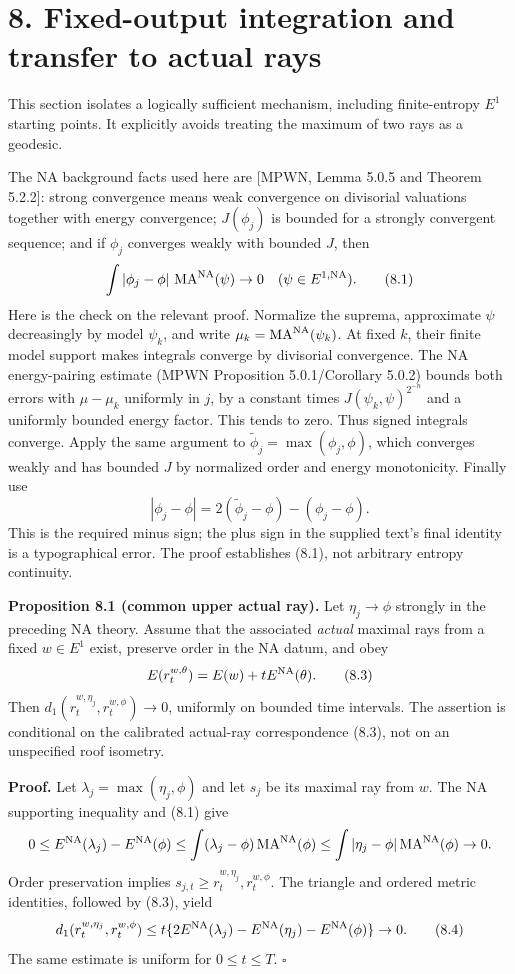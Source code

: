 \documentclass[
  11pt,
]{article}
\begin{document}
\section{8. Fixed-output integration and transfer to actual
rays}\label{fixed-output-integration-and-transfer-to-actual-rays}

This section isolates a logically sufficient mechanism, including
finite-entropy \(E^1\) starting points. It explicitly avoids treating
the maximum of two rays as a geodesic.

The NA background facts used here are {[}MPWN, Lemma 5.0.5 and Theorem
5.2.2{]}: strong convergence means weak convergence on divisorial
valuations together with energy convergence; \(J(\phi_j)\) is bounded
for a strongly convergent sequence; and if \(\phi_j\) converges weakly
with bounded \(J\), then \[
 \int|\phi_j-\phi|\,\operatorname{MA}^{\rm NA}(\psi)\to0
       \quad(\psi\in E^{1,\rm NA}).                         \tag{8.1}
\] Here is the check on the relevant proof. Normalize the suprema,
approximate \(\psi\) decreasingly by model \(\psi_k\), and write
\(\mu_k=\operatorname{MA}^{\rm NA}(\psi_k)\). At fixed \(k\), their
finite model support makes integrals converge by divisorial convergence.
The NA energy-pairing estimate (MPWN Proposition 5.0.1/Corollary 5.0.2)
bounds both errors with \(\mu-\mu_k\) uniformly in \(j\), by a constant
times \(J(\psi_k,\psi)^{2^{-n}}\) and a uniformly bounded energy factor.
This tends to zero. Thus signed integrals converge. Apply the same
argument to \(\widetilde\phi_j=\max(\phi_j,\phi)\), which converges
weakly and has bounded \(J\) by normalized order and energy
monotonicity. Finally use \[
 |\phi_j-\phi|=2(\widetilde\phi_j-\phi)-(\phi_j-\phi).
                                                               \tag{8.2}
\] This is the required minus sign; the plus sign in the supplied text's
final identity is a typographical error. The proof establishes (8.1),
not arbitrary entropy continuity.

\textbf{Proposition 8.1 (common upper actual ray).} Let
\(\eta_j\to\phi\) strongly in the preceding NA theory. Assume that the
associated \emph{actual} maximal rays from a fixed \(w\in E^1\) exist,
preserve order in the NA datum, and obey \[
 E(r_t^{w,\theta})=E(w)+tE^{\rm NA}(\theta).                \tag{8.3}
\] Then \(d_1(r_t^{w,\eta_j},r_t^{w,\phi})\to0\), uniformly on bounded
time intervals. The assertion is conditional on the calibrated
actual-ray correspondence (8.3), not on an unspecified roof isometry.

\textbf{Proof.} Let \(\lambda_j=\max(\eta_j,\phi)\) and let \(s_j\) be
its maximal ray from \(w\). The NA supporting inequality and (8.1) give
\[
 0\leq E^{\rm NA}(\lambda_j)-E^{\rm NA}(\phi)
 \leq\int(\lambda_j-\phi)\operatorname{MA}^{\rm NA}(\phi)
 \leq\int|\eta_j-\phi|\operatorname{MA}^{\rm NA}(\phi)\to0.
\] Order preservation implies
\(s_{j,t}\geq r_t^{w,\eta_j},r_t^{w,\phi}\). The triangle and ordered
metric identities, followed by (8.3), yield \[
 d_1(r_t^{w,\eta_j},r_t^{w,\phi})
 \leq t\{2E^{\rm NA}(\lambda_j)-E^{\rm NA}(\eta_j)-E^{\rm NA}(\phi)\}\to0.
                                                               \tag{8.4}
\] The same estimate is uniform for \(0\leq t\leq T\). \(\square\)
\end{document}
